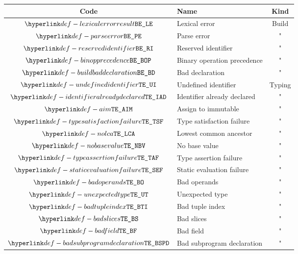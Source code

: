 \begin{center}
\newcommand{\qq}{\symbol{34}} %
\begin{tabular}{clc}
\hline
\textbf{Code} & \textbf{Name} & \textbf{Kind} \\
\hline
  $\LexicalError$                & Lexical error                  & Build         \\
  $\ParseError$                  & Parse error                    & "             \\
  $\ReservedIdentifier$          & Reserved identifier            & "             \\
  $\BinopPrecedence$             & Binary operation precedence    & "             \\
  $\BuildBadDeclaration$         & Bad declaration                & "             \\
  \hline
  $\UndefinedIdentifier$         & Undefined identifier           & Typing        \\
  $\IdentifierAlreadyDeclared$   & Identifier already declared    & "             \\
  $\AssignmentToImmutable$       & Assign to immutable            & "             \\
  $\TypeSatisfactionFailure$     & Type satisfaction failure      & "             \\
  $\NoLCA$                       & Lowest common ancestor         & "             \\
  $\NoBaseValue$                 & No base value                  & "             \\
  $\TypeAssertionFailure$        & Type assertion failure         & "             \\
  $\StaticEvaluationFailure$     & Static evaluation failure      & "             \\
  $\BadOperands$                 & Bad operands                   & "             \\
  $\UnexpectedType$              & Unexpected type                & "             \\
  $\BadTupleIndex$               & Bad tuple index                & "             \\
  $\BadSlices$                   & Bad slices                     & "             \\
  $\BadField$                    & Bad field                      & "             \\
  $\BadSubprogramDeclaration$    & Bad subprogram declaration     & "             \\

\end{tabular}
\end{center}
